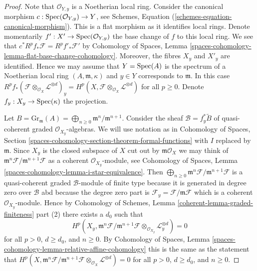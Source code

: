 \begin{proof}
Note that $\mathcal{O}_{Y, y}$ is a Noetherian local ring.
Consider the canonical morphism
$c : \operatorname{Spec}(\mathcal{O}_{Y, y}) \to Y$, see
Schemes, Equation (\ref{schemes-equation-canonical-morphism}).
This is a flat morphism as it identifies local rings.
Denote momentarily $f' : X' \to \operatorname{Spec}(\mathcal{O}_{Y, y})$
the base change of $f$ to this local ring. We see that
$c^*R^pf_*\mathcal{F} = R^pf'_*\mathcal{F}'$ by
Cohomology of Spaces, Lemma
\ref{spaces-cohomology-lemma-flat-base-change-cohomology}.
Moreover, the fibres $X_y$ and $X'_y$ are identified.
Hence we may assume that $Y = \operatorname{Spec}(A)$ is the spectrum of
a Noetherian local ring $(A, \mathfrak m, \kappa)$ and $y \in Y$
corresponds to $\mathfrak m$. In this case
$R^pf_*(\mathcal{F} \otimes_{\mathcal{O}_X} \mathcal{L}^{\otimes d})_y =
H^p(X, \mathcal{F} \otimes_{\mathcal{O}_X} \mathcal{L}^{\otimes d})$
for all $p \geq 0$. Denote $f_y : X_y \to \operatorname{Spec}(\kappa)$ the projection.

\medskip\noindent
Let $B = \text{Gr}_\mathfrak m(A) =
\bigoplus_{n \geq 0} \mathfrak m^n/\mathfrak m^{n + 1}$.
Consider the sheaf $\mathcal{B} = f_y^*\widetilde{B}$
of quasi-coherent graded $\mathcal{O}_{X_y}$-algebras.
We will use notation as in Cohomology of Spaces, Section
\ref{spaces-cohomology-section-theorem-formal-functions}
with $I$ replaced by $\mathfrak m$.
Since $X_y$ is the closed subspace of $X$ cut out by
$\mathfrak m\mathcal{O}_X$ we may think of
$\mathfrak m^n\mathcal{F}/\mathfrak m^{n + 1}\mathcal{F}$
as a coherent $\mathcal{O}_{X_y}$-module, see
Cohomology of Spaces, Lemma \ref{spaces-cohomology-lemma-i-star-equivalence}.
Then
$\bigoplus_{n \geq 0} \mathfrak m^n\mathcal{F}/\mathfrak m^{n + 1}\mathcal{F}$
is a quasi-coherent graded $\mathcal{B}$-module of finite type
because it is generated in degree zero over $\mathcal{B}$
abd because the degree zero part is
$\mathcal{F}_y = \mathcal{F}/\mathfrak m \mathcal{F}$
which is a coherent $\mathcal{O}_{X_y}$-module.
Hence by Cohomology of Schemes, Lemma
\ref{coherent-lemma-graded-finiteness} part (2)
there exists a $d_0$ such that
$$
H^p(X_y, \mathfrak m^n \mathcal{F}/ \mathfrak m^{n + 1}\mathcal{F}
\otimes_{\mathcal{O}_{X_y}} \mathcal{L}_y^{\otimes d}) = 0
$$
for all $p > 0$, $d \geq d_0$, and $n \geq 0$. By
Cohomology of Spaces, Lemma
\ref{spaces-cohomology-lemma-relative-affine-cohomology}
this is the same as the statement that
$
H^p(X, \mathfrak m^n \mathcal{F}/ \mathfrak m^{n + 1}\mathcal{F}
\otimes_{\mathcal{O}_X} \mathcal{L}^{\otimes d}) = 0
$
for all $p > 0$, $d \geq d_0$, and $n \geq 0$.


\end{proof}
